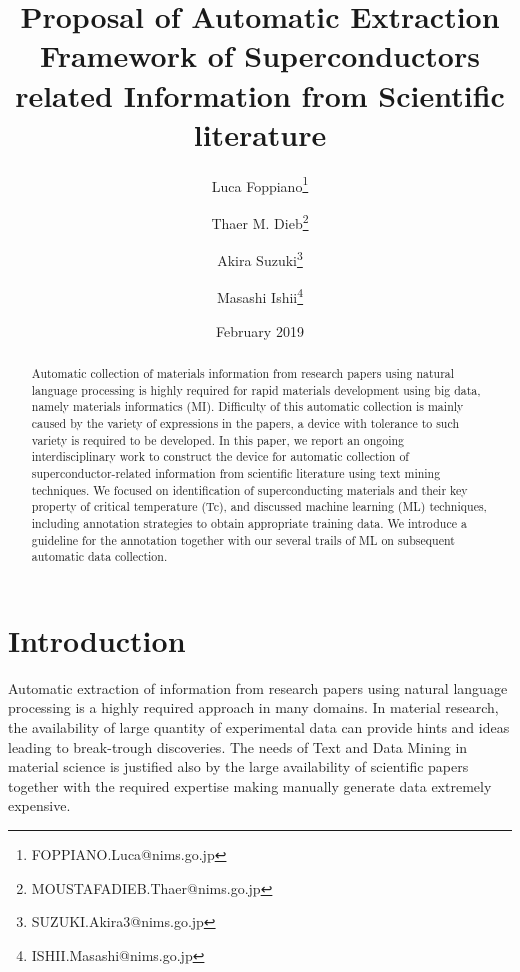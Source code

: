 \documentclass{article}
\title{Proposal of Automatic Extraction Framework of Superconductors related Information from Scientific literature}
\author[1]{Luca Foppiano\thanks{FOPPIANO.Luca@nims.go.jp}}
\author[1]{Thaer M. Dieb\thanks{MOUSTAFADIEB.Thaer@nims.go.jp}}
\author[1]{Akira Suzuki\thanks{SUZUKI.Akira3@nims.go.jp}}
\author[1]{Masashi Ishii\thanks{ISHII.Masashi@nims.go.jp}}
\affil[1]{Research and Services Division of Materials Data and Integrated System (MaDIS), National Institute for Materials Science (NIMS), 1-2-1 Sengen, Tsukuba, Ibaraki 305-0047, Japan}
\date{February 2019}
\begin{document}
\maketitle

\begin{abstract}
Automatic collection of materials information from research papers using natural language processing is highly required for rapid materials development using big data, namely materials informatics (MI). Difficulty of this automatic collection is mainly caused by the variety of expressions in the papers, a device with tolerance to such variety is required to be developed. 
In this paper, we report an ongoing interdisciplinary work to construct the device for automatic collection of superconductor-related information from scientific literature using text mining techniques. We focused on identification of superconducting materials and their key property of critical temperature (Tc), and discussed machine learning (ML) techniques, including annotation strategies to obtain appropriate training data. We introduce a guideline for the annotation together with our several trails of ML on subsequent automatic data collection.
\end{abstract}

\pagebreak

\tableofcontents

\pagebreak



\section{Introduction}


Automatic extraction of information from research papers using natural language processing is a highly required approach in many domains. 
In material research, the availability of large quantity of experimental data can provide hints and ideas leading to break-trough discoveries. 
The needs of Text and Data Mining in material science is justified also by the large availability of scientific papers together with the required expertise making manually generate data extremely expensive. 
\end{document}
